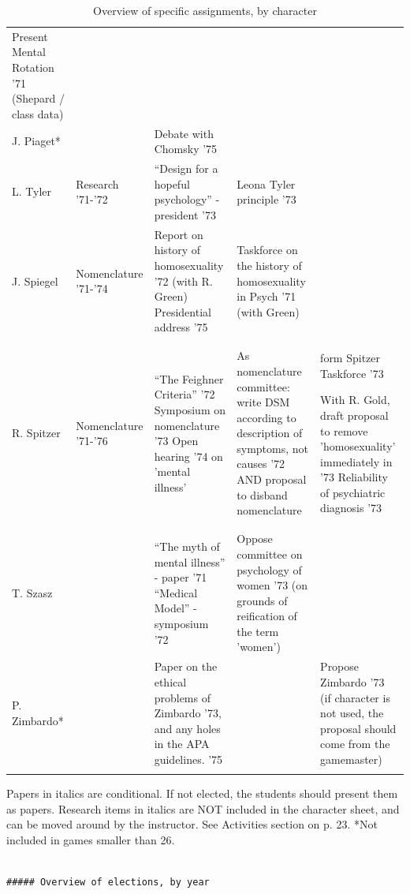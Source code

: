 \begin{longtable}[!t]{ | p{1cm} | p{2cm} | p{1cm} |  p{3cm} |  p{3cm} | }
Present Mental Rotation '71 (Shepard / class data)\\
J. Piaget*&
&
Debate with Chomsky '75&
&
\\
L. Tyler&
Research '71-'72&
“Design for a hopeful psychology” - president '73&
Leona Tyler principle '73&
\\
J. Spiegel&
Nomenclature '71-'74&
Report on history of homosexuality '72 (with R. Green)
Presidential address '75&
Taskforce on the history of homosexuality in Psych '71 (with Green)&
\\
R. Spitzer&
Nomenclature '71-'76&
“The Feighner Criteria” '72\newline
Symposium on nomenclature '73\newline
Open hearing '74 on 'mental illness’&

As nomenclature committee: write DSM according to description of symptoms, not causes '72
AND proposal to disband nomenclature & form Spitzer Taskforce '73\newline

With R. Gold, draft proposal to remove 'homosexuality' immediately in '73
Reliability of psychiatric diagnosis '73\\
T. Szasz&
&
“The myth of mental illness” - paper '71\newline
“Medical Model” -  symposium '72&
Oppose committee on psychology of women '73 (on grounds of reification of the term 'women’)&
\\
P. Zimbardo*&
&
Paper on the ethical problems of Zimbardo '73, \newline and any holes in the APA guidelines. '75&
&
Propose Zimbardo '73 (if character is not used, the proposal should come from the gamemaster)\\ \hline

\caption{Overview of specific assignments, by character}
\label{table: overviewcharacter}
\end{longtable}

Papers in italics are conditional. If not elected, the students should present them as papers.
Research items in italics are NOT included in the character sheet, and can be moved around by the instructor. See Activities section on p. 23.
*Not included in games smaller than 26.

\begin{adjustwidth}{2.5em}{2.5em}
\begin{verbatim}

##### Overview of elections, by year

\end{verbatim}
\end{adjustwidth}

